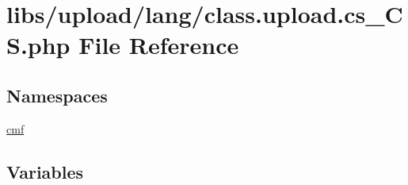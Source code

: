 \hypertarget{class_8upload_8cs___c_s_8php}{}\section{libs/upload/lang/class.upload.\+cs\+\_\+\+C\+S.\+php File Reference}
\label{class_8upload_8cs___c_s_8php}
\subsection*{Namespaces}
\begin{DoxyCompactItemize}
\item 
 \hyperlink{namespacecmf}{cmf}
\end{DoxyCompactItemize}
\subsection*{Variables}
